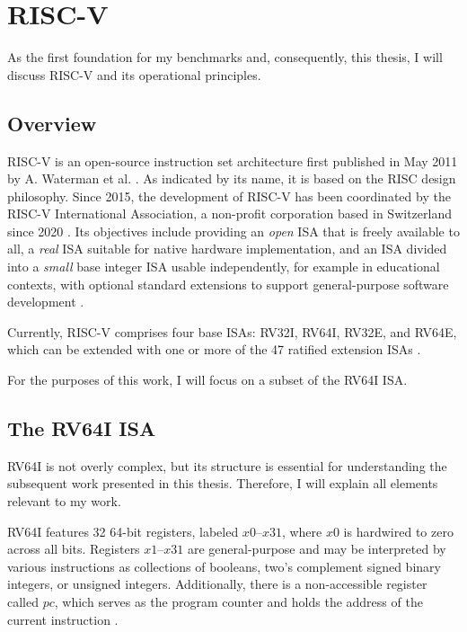 \chapter{RISC-V}\label{chap:riscv}

As the first foundation for my benchmarks and, consequently, this
thesis, I will discuss RISC-V and its operational principles.

\section{Overview}

RISC-V is an open-source instruction set architecture first published
in May 2011 by A. Waterman et al. \cite{first_riscv}. As indicated by
its name, it is based on the RISC design philosophy.  Since 2015, the development of RISC-V has been
coordinated by the RISC-V International Association, a non-profit
corporation based in Switzerland since 2020 \cite{riscvorg}. Its
objectives include providing an \emph{open} ISA that is freely
available to all, a \emph{real} ISA suitable for native hardware
implementation, and an ISA divided into a \emph{small} base integer
ISA usable independently, for example in educational contexts, with
optional standard extensions to support general-purpose software
development \cite[Chapter 1]{riscv-isa}.

Currently, RISC-V comprises four base ISAs: RV32I, RV64I, RV32E, and
RV64E, which can be extended with one or more of the 47 ratified
extension ISAs \cite[Preface]{riscv-isa}.


For the purposes of this work, I will focus on a subset of the RV64I
ISA.

\section{The RV64I ISA} \label{sec:riscvIsa}
RV64I is not overly complex, but its structure is essential for
understanding the subsequent work presented in this thesis.
Therefore, I will explain all elements relevant to my work.

RV64I features 32 64-bit registers, labeled $x0$–$x31$, where $x0$ is
hardwired to zero across all bits. Registers $x1$–$x31$ are
general-purpose and may be interpreted by various instructions as
collections of booleans, two's complement signed binary integers, or
unsigned integers. Additionally, there is a non-accessible register
called $pc$, which serves as the program counter and holds the
address of the current instruction \cite[Chapters 4.1,
      2.1]{riscv-isa}.


